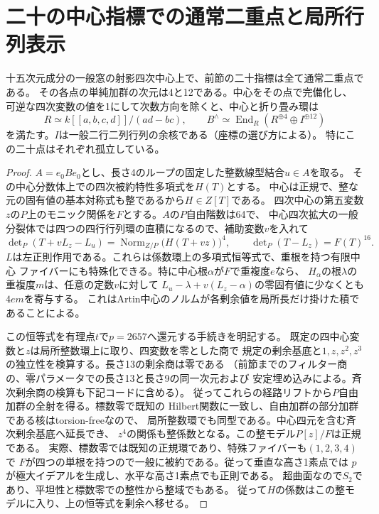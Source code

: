 \section{二十の中心指標での通常二重点と局所行列表示}
\label{sec:twenty-central-nodes}
\begin{theorem}\label{thm:twenty-central-nodes}
十五次元成分の一般窓の射影四次中心上で、前節の二十指標は全て通常二重点である。
その各点の単純加群の次元は4と12である。中心をその点で完備化し、
可逆な四次変数の値を1にして次数方向を除くと、中心と折り畳み環は
\[
 R\simeq k[[a,b,c,d]]/(ad-bc),\qquad
 B^{\wedge}\simeq\operatorname{End}_R(R^{\oplus4}\oplus I^{\oplus12})
\]
を満たす。$I$は一般二行二列行列の余核である（座標の選び方による）。
特にこの二十点はそれぞれ孤立している。
\end{theorem}
\begin{proof}
$A=e_0Be_0$とし、長さ4のループの固定した整数線型結合$u\in A$を取る。
その中心分数体上での四次被約特性多項式を$H(T)$とする。
中心は正規で、整な元の固有値の基本対称式も整であるから$H\in Z[T]$である。
四次中心の第五変数$z$の$P$上のモニック関係を$F$とする。$A$の$P$自由階数は64で、
中心四次拡大の一般分裂体では四つの四行行列環の直積になるので、補助変数$v$を入れて
\[
 \det\nolimits_{P}(T+vL_z-L_u)
   =\operatorname{Norm}_{Z/P}\bigl(H(T+vz)\bigr)^4,\qquad
 \det\nolimits_P(T-L_z)=F(T)^{16}.
\]
$L$は左正則作用である。これらは係数環上の多項式恒等式で、重根を持つ有限中心
ファイバーにも特殊化できる。特に中心根$\alpha$が$F$で重複度$e$なら、
$H_\alpha$の根$\lambda$の重複度$m$は、任意の定数$v$に対して
$L_u-\lambda+v(L_z-\alpha)$の零固有値に少なくとも$4em$を寄与する。
これはArtin中心のノルムが各剰余値を局所長だけ掛けた積であることによる。

この恒等式を有理点$t$で$p=2657$へ還元する手続きを明記する。
既定の四中心変数と$z$は局所整数環上に取り、四変数を零とした商で
規定の剰余基底と$1,z,z^2,z^3$の独立性を検算する。長さ13の剰余商は零である
（前節までのフィルター商の、零パラメータでの長さ13と長さ9の同一次元および
安定埋め込みによる。斉次剰余商の検算も下記コードに含める）。
従ってこれらの経路リフトから$P$自由加群の全射を得る。標数零で既知の
Hilbert関数に一致し、自由加群の部分加群である核はtorsion-freeなので、
局所整数環でも同型である。中心四元を含む斉次剰余基底へ延長でき、
$z^4$の関係も整係数となる。この整モデル$P[z]/F$は正規である。
実際、標数零では既知の正規環であり、特殊ファイバーも$(1,2,3,4)$で
$F$が四つの単根を持つので一般に被約である。従って垂直な高さ1素点では
$p$が極大イデアルを生成し、水平な高さ1素点でも正則である。
超曲面なので$S_2$であり、平坦性と標数零での整性から整域でもある。
従って$H$の係数はこの整モデルに入り、上の恒等式を剰余へ移せる。


\end{proof}
